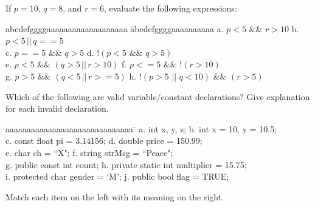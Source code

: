 {\begin{list}{E \thechapter.\theenumi}
\item If $p = 10$, $q = 8$, and $r = 6$, evaluate the following
expressions:


\begin{tabbing}
abcdefggggaaaaaaaaaaaaaaaaaaa \= abcdefggggaaaaaaaaaa \kill
  a. $p < 5 \,\,\&\&\,\, r > 10$ \> b. $p < 5 \,\vert\vert\, q == 5$ \\
  c. $p == 5 \,\,\&\&\,\, q > 5$ \> d. $!(p < 5 \,\, \&\& \, \, q > 5)$ \\
  e. $p < 5 \,\,\&\&\,\, (q > 5 \,\vert\vert\, r > 10)$ \> f. $p <\!= 5 \,\,\&\&\,\, !(r > 10)$ \\
  g. $p > 5 \,\,\&\&\,\, (q < 5 \,\vert\vert\, r >\!= 5)$ \> h. $!(p > 5 \,\,\vert\vert\,\, q < 10) \,\,\&\&\,\, (r > 5)$
  \\
\end{tabbing}


\item Which of the following are valid variable/constant
declarations? Give explanation for each invalid declaration.


\begin{tabbing}
aaaaaaaaaaaaaaaaaaaaaaaaaaaaaa \= \kill
a. int x, y, z; \> b.  int x = 10, y = 10.5;\\
c.  const float pi = 3.14156; \> d.  double price = 150.99; \\
e.  char ch = ``X"; \> f.  string strMsg = ``Peace"; \\
g.  public const int count; \> h. private static int multiplier =
15.75; \\
i. protected char gender = `M'; \> j. public bool flag = TRUE;
\end{tabbing}



\item Match each item on the left with its meaning on the right.




\end{list}}
